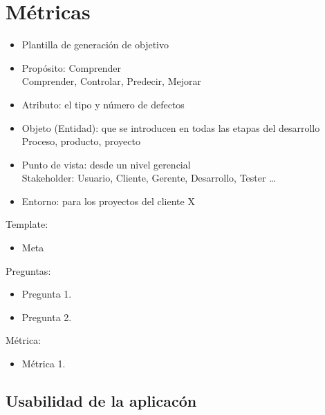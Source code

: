 \section{Métricas}

\begin{itemize}
    \item Plantilla de generación de objetivo
    \item Propósito: Comprender
    \\ Comprender, Controlar, Predecir, Mejorar
    \item Atributo: el tipo y número de defectos
    \item Objeto (Entidad): que se introducen en todas las etapas del desarrollo
    \\Proceso, producto, proyecto
    \item Punto de vista: desde un nivel gerencial
    \\ Stakeholder: Usuario, Cliente, Gerente, Desarrollo, Tester …
    \item Entorno: para los proyectos del cliente X
\end{itemize}

Template:


\begin{itemize}
    \item Meta
\end{itemize}

Preguntas:
\begin{itemize}
    \item Pregunta 1.
    \item Pregunta 2.
\end{itemize}

Métrica:
\begin{itemize}
    \item Métrica 1.
\end{itemize}

\subsection{Usabilidad de la aplicacón}

